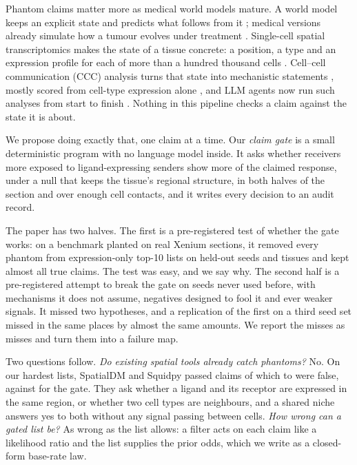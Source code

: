 \documentclass[letterpaper]{article} %
\begin{document}
Phantom claims matter more as medical world models mature. A world model keeps an explicit state and predicts what
follows from it \cite{ha2018worldmodels}; medical versions already simulate how a tumour evolves under treatment
\cite{yang2025mwm}. Single-cell spatial transcriptomics makes the state of a tissue concrete: a position, a type and an
expression profile for each of more than a hundred thousand cells \cite{janesick2023}. Cell--cell communication (CCC)
analysis turns that state into mechanistic statements \cite{armingol2021}, mostly scored from cell-type expression
alone \cite{efremova2020cellphonedb,jin2021cellchat,dimitrov2022liana}, and LLM agents now run such analyses from start
to finish \cite{huang2025biomni,xiao2024cellagent}. Nothing in this pipeline checks a claim against the state it is
about.

We propose doing exactly that, one claim at a time. Our \emph{claim gate} is a small deterministic program with no
language model inside. It asks whether receivers more exposed to ligand-expressing senders show more of the claimed
response, under a null that keeps the tissue's regional structure, in both halves of the section and over enough cell
contacts, and it writes every decision to an audit record.

The paper has two halves. The first is a pre-registered test of whether the gate works: on a benchmark planted on real
Xenium sections, it removed every phantom from expression-only top-10 lists on held-out seeds and tissues and kept
almost all true claims. The test was easy, and we say why. The second half is a pre-registered attempt to break the
gate on seeds never used before, with mechanisms it does not assume, negatives designed to fool it and ever weaker
signals. It missed two hypotheses, and a replication of the first on a third seed set missed in the same places by
almost the same amounts. We report the misses as misses and turn them into a failure map.

Two questions follow. \emph{Do existing spatial tools already catch phantoms?} No. On our hardest lists, SpatialDM
\cite{li2023spatialdm} and Squidpy \cite{palla2022squidpy} passed claims of which \sbNhoodFPS{} to \sbSpatialdmFPS{}
were false, against \sbGateFPS{} for the gate. They ask whether a ligand and its receptor are expressed in the same
region, or whether two cell types are neighbours, and a shared niche answers yes to both without any signal passing
between cells. \emph{How wrong can a gated list be?} As wrong as the list allows: a filter acts on each claim like a
likelihood ratio and the list supplies the prior odds, which we write as a closed-form base-rate law.
\end{document}
